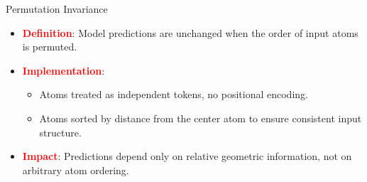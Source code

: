 \documentclass[10pt]{beamer}
\begin{document}





\begin{frame}{Permutation Invariance}
  \begin{itemize}
    \item \textcolor{red}{\textbf{Definition}}: Model predictions are unchanged when the order of input atoms is permuted.
    \vspace{0.3cm}
    \item \textcolor{red}{\textbf{Implementation}}: 
      \begin{itemize}
        \item Atoms treated as independent tokens, no positional encoding.
        \vspace{0.3cm}
        \item Atoms sorted by distance from the center atom to ensure consistent input structure.
      \end{itemize}
    \vspace{0.3cm}
    \item \textcolor{red}{\textbf{Impact}}: Predictions depend only on relative geometric information, not on arbitrary atom ordering.
  \end{itemize}
\end{frame}
\end{document}
